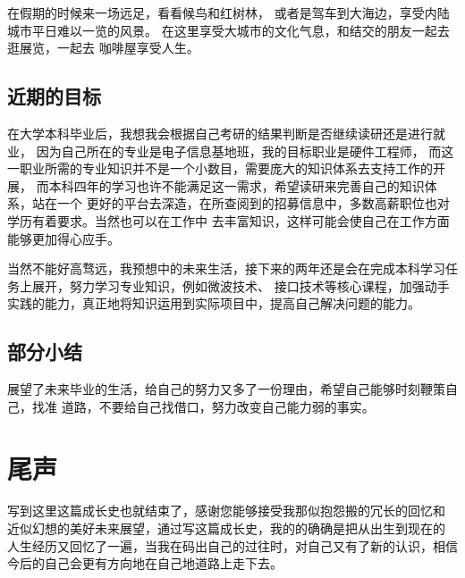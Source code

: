 \documentclass[AutoFakeBold]{LZUThesis}
\begin{document}
在假期的时候来一场远足，看看候鸟和红树林，
或者是驾车到大海边，享受内陆城市平日难以一览的风景。
在这里享受大城市的文化气息，和结交的朋友一起去逛展览，一起去
咖啡屋享受人生。

\section{近期的目标}
在大学本科毕业后，我想我会根据自己考研的结果判断是否继续读研还是进行就业，
因为自己所在的专业是电子信息基地班，我的目标职业是硬件工程师，
而这一职业所需的专业知识并不是一个小数目，需要庞大的知识体系去支持工作的开展，
而本科四年的学习也许不能满足这一需求，希望读研来完善自己的知识体系，站在一个
更好的平台去深造，在所查阅到的招募信息中，多数高薪职位也对学历有着要求。当然也可以在工作中
去丰富知识，这样可能会使自己在工作方面能够更加得心应手。

当然不能好高骛远，我预想中的未来生活，接下来的两年还是会在完成本科学习任务上展开，努力学习专业知识，例如微波技术、
接口技术等核心课程，加强动手实践的能力，真正地将知识运用到实际项目中，提高自己解决问题的能力。

\section{部分小结}
展望了未来毕业的生活，给自己的努力又多了一份理由，希望自己能够时刻鞭策自己，找准
道路，不要给自己找借口，努力改变自己能力弱的事实。

\chapter{尾声}
写到这里这篇成长史也就结束了，感谢您能够接受我那似抱怨搬的冗长的回忆和
近似幻想的美好未来展望，通过写这篇成长史，我的的确确是把从出生到现在的
人生经历又回忆了一遍，当我在码出自己的过往时，对自己又有了新的认识，相信
今后的自己会更有方向地在自己地道路上走下去。
\backmatter


\printbib
\nocite{*} %




\end{document}
